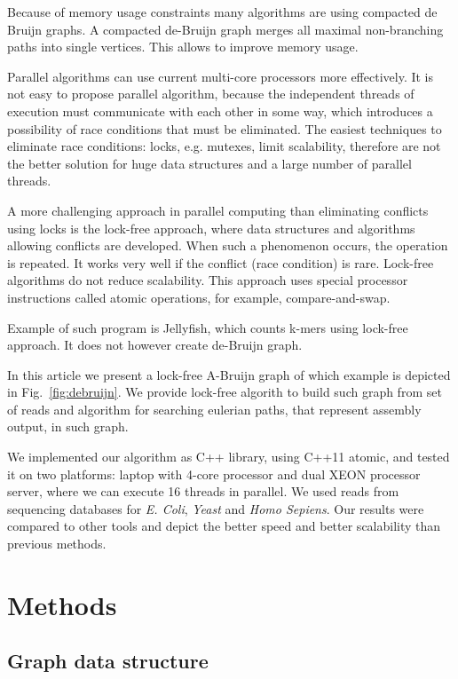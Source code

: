 \documentclass[12pt]{article}
\begin{document}
Because of memory usage constraints many algorithms are using compacted de Bruijn graphs. A compacted de-Bruijn graph merges all maximal non-branching paths into single vertices. This allows to improve memory usage.

Parallel algorithms can use current multi-core processors more effectively. It is not easy to propose parallel algorithm,
because the independent threads of execution must communicate with each other in some way, which introduces a possibility of race conditions that must be eliminated.
The easiest techniques to eliminate race conditions: locks, e.g. mutexes, limit scalability, therefore are not the better solution for huge data structures and a large number of parallel threads.

A more challenging approach in parallel computing than eliminating conflicts using locks is the lock-free approach, where data structures and algorithms allowing conflicts are developed. When such a phenomenon occurs, the operation is repeated. It works very well if the conflict (race condition) is rare. Lock-free algorithms do not reduce scalability.
This approach uses special processor instructions called atomic operations, for example, compare-and-swap.

Example of such program is Jellyfish, which counts k-mers using lock-free approach. It does not however create de-Bruijn graph.

In this article we present a lock-free A-Bruijn graph of which example is depicted in Fig.~\ref{fig:debruijn}.
We provide lock-free algorith to build such graph from set of reads and algorithm for searching eulerian paths, that represent assembly output, in such graph.

We implemented our algorithm as C++ library, using C++11 atomic, and tested it on two platforms:
laptop with 4-core processor and dual XEON processor server, where we can execute 16 threads in parallel.
We used reads from sequencing databases for \textit{E. Coli}, \textit{Yeast} and \textit{Homo Sepiens}.
Our results were compared to other tools and depict the better speed and better scalability than previous methods.

\section{Methods}

\subsection{Graph data structure}
\end{document}
